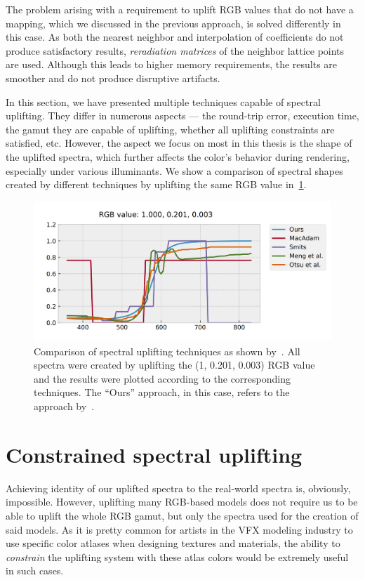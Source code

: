 The problem arising with a requirement to uplift RGB values that do not have a mapping, which we discussed in the previous approach, is solved differently in this case. As both the nearest neighbor and interpolation of coefficients do not produce satisfactory results, \emph{reradiation matrices} of the neighbor lattice points are used. Although this leads to higher memory requirements, the results are smoother and do not produce disruptive artifacts. 

In this section, we have presented multiple techniques capable of spectral uplifting. They differ in numerous aspects --- the round-trip error, execution time, the gamut they are capable of uplifting, whether all uplifting constraints are satisfied, etc. However, the aspect we focus on most in this thesis is the shape of the uplifted spectra, which further affects the color's behavior during rendering, especially under various illuminants. We show a comparison of spectral shapes created by different techniques by uplifting the same RGB value in~\cref{fig:upliftingTechniques}.

\begin{figure}[t!]
	\centering
	\includegraphics[width=0.8\linewidth]{img/upsampling_techniques.png}
	\caption{Comparison of spectral uplifting techniques as shown by~\citet{upsamplingJakobHanika}. All spectra were created by uplifting the (1, 0.201, 0.003) RGB value and the results were plotted according to the corresponding techniques. The ``Ours'' approach, in this case, refers to the approach by~\citet{upsamplingJakobHanika}.}
	\label{fig:upliftingTechniques}
\end{figure}

\section{Constrained spectral uplifting}

Achieving identity of our uplifted spectra to the real-world spectra is, obviously, impossible. However, uplifting many RGB-based models does not require us to be able to uplift the whole RGB gamut, but only the spectra used for the creation of said models. As it is pretty common for artists in the VFX modeling industry to use specific color atlases when designing textures and materials, the ability to \emph{constrain} the uplifting system with these atlas colors would be extremely useful in such cases.

